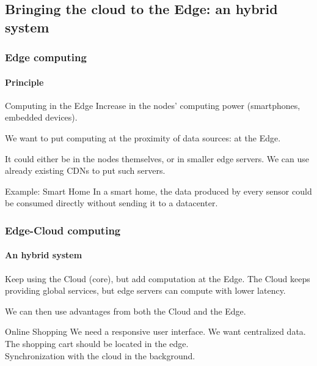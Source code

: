 \documentclass[utf8,xcolor=table, page number]{earlywinter}
\begin{document}
\subsection{Bringing the cloud to the Edge: an hybrid system} %
\begin{frame}
  \frametitle{Edge computing}
  \framesubtitle{Principle}

  \begin{block}{Computing in the Edge}
    Increase in the nodes' computing power (smartphones, embedded devices).
  \end{block}
   We want to put computing at the proximity of data sources: at the Edge.

   It could either be in the nodes themselves, or in smaller edge servers. We can use already existing CDNs to put such servers.
  
   \begin{exampleblock}{Example: Smart Home}
     In a smart home, the data produced by every sensor could be consumed directly without sending it to a datacenter.
   \end{exampleblock}

\end{frame}

\begin{frame}
  \frametitle{Edge-Cloud computing}
  \framesubtitle{An hybrid system}

%
  Keep using the Cloud (core), but add computation at the Edge.
  The Cloud keeps providing global services, but edge servers can compute with lower latency.

  We can then use advantages from both the Cloud and the Edge.
  
  \begin{exampleblock}{Online Shopping}
    We need a responsive user interface. We want centralized data.\\
    The shopping cart should be located in the edge.\\
    Synchronization with the cloud in the background.
  \end{exampleblock}
  
\end{frame}
\end{document}
